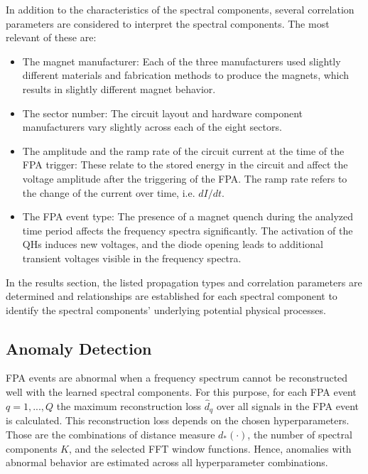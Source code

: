 \documentclass[lettersize,journal]{IEEEtran}
\begin{document}
In addition to the characteristics of the spectral components, several correlation parameters are considered to interpret the spectral components.
The most relevant of these are:
\begin{itemize}
\item The magnet manufacturer: Each of the three manufacturers used slightly different materials and fabrication methods to produce the magnets, which results in slightly different magnet behavior.
\item The sector number: The circuit layout and hardware component manufacturers vary slightly across each of the eight sectors.
\item The amplitude and the ramp rate of the circuit current at the time of the FPA trigger: 
These relate to the stored energy in the circuit and affect the voltage amplitude after the triggering of the FPA. The ramp rate refers to the change of the current over time, i.e. $dI/dt$.
\item The FPA event type: The presence of a magnet quench during the analyzed time period affects the frequency spectra significantly.
The activation of the QHs induces new voltages, and the diode opening leads to additional transient voltages visible in the frequency spectra.
\end{itemize}

In the results section, the listed propagation types and correlation parameters are determined and relationships are established for each spectral component to identify the spectral components' underlying potential physical processes.


\subsection{Anomaly Detection} \label{Anomaly Detection} 
FPA events are abnormal when a frequency spectrum cannot be reconstructed well with the learned spectral components.
For this purpose, for each FPA event  $q = 1, ..., Q$ the maximum reconstruction loss $\hat{d}_q$ over all signals in the FPA event is calculated.
This reconstruction loss depends on the chosen hyperparameters. 
Those are the combinations of distance measure $d_*(\cdot)$, the number of spectral components $K$, and the selected FFT window functions.
Hence, anomalies with abnormal behavior are estimated across all hyperparameter combinations. 
\end{document}
